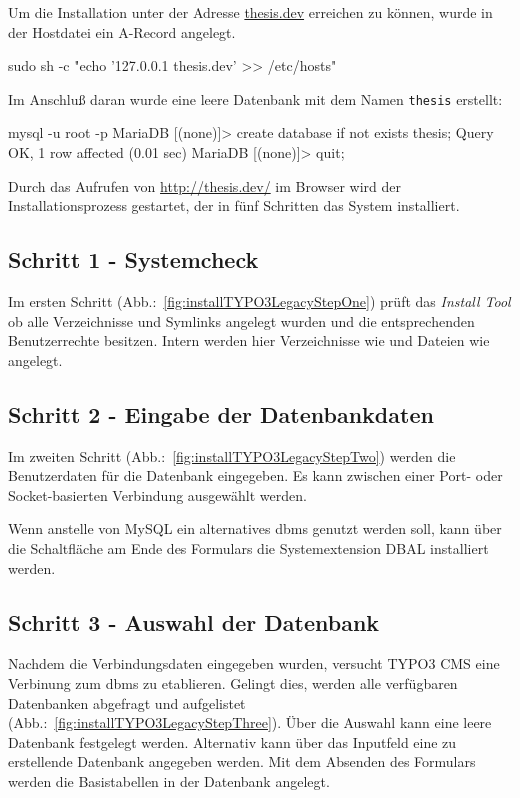 Um die Installation unter der Adresse \url{thesis.dev} erreichen zu können, wurde in der Hostdatei ein A-Record angelegt.

\begin{shcode}
sudo sh -c "echo '127.0.0.1 thesis.dev' >> /etc/hosts"
\end{shcode}

Im Anschluß daran wurde eine leere Datenbank mit dem Namen \texttt{thesis} erstellt:

\begin{shcode}
mysql -u root -p
MariaDB [(none)]> create database if not exists thesis;
Query OK, 1 row affected (0.01 sec)
MariaDB [(none)]> quit;
\end{shcode}

Durch das Aufrufen von \url{http://thesis.dev/} im Browser wird der Installationsprozess gestartet, der in fünf Schritten das System installiert.

\subsection{Schritt 1 - Systemcheck}
	Im ersten Schritt (Abb.:~\ref{fig:installTYPO3LegacyStepOne}) prüft das \textit{Install Tool} ob alle Verzeichnisse und Symlinks angelegt wurden und die entsprechenden Benutzerrechte besitzen. Intern werden hier Verzeichnisse wie  und Dateien wie  angelegt.

\subsection{Schritt 2 - Eingabe der Datenbankdaten}
	Im zweiten Schritt (Abb.:~\ref{fig:installTYPO3LegacyStepTwo}) werden die Benutzerdaten für die Datenbank eingegeben. Es kann zwischen einer Port- oder Socket-basierten Verbindung ausgewählt werden.

	Wenn anstelle von MySQL ein alternatives \gls{dbms} genutzt werden soll, kann über die Schaltfläche am Ende des Formulars die Systemextension DBAL installiert werden.

\subsection{Schritt 3 - Auswahl der Datenbank}
	Nachdem die Verbindungsdaten eingegeben wurden, versucht TYPO3 CMS eine Verbinung zum \gls{dbms} zu etablieren. Gelingt dies, werden alle verfügbaren Datenbanken abgefragt und aufgelistet (Abb.:~\ref{fig:installTYPO3LegacyStepThree}). Über die Auswahl kann eine leere Datenbank festgelegt werden. Alternativ kann über das Inputfeld eine zu erstellende Datenbank angegeben werden. Mit dem Absenden des Formulars werden die Basistabellen in der Datenbank angelegt.

